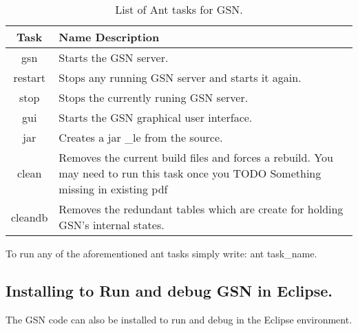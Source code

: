 \setlength{\tymin}{10pt}
\setlength{\tymax}{0.8\textwidth}
\begin{table*}[!htp] 
\centering
{\normalfont\footnotesize
\begin{tabulary}{\textwidth}{|C|J|}%
\hline

Task
 & 
Name Description
 \\
\hline

gsn
 & 
Starts the GSN server.
 \\
\hline

restart
 & 
Stops any running GSN server and starts it again.
 \\
\hline

stop
 & 
Stops the currently runing GSN server.
 \\
\hline

gui
 & 
Starts the GSN graphical user interface.
 \\
\hline

jar
 & 
Creates a jar \_le from the source.
 \\
\hline

clean
 & 
Removes the current build files and forces a rebuild. You may need to
run this task once you TODO Something missing in existing pdf
 \\
\hline

cleandb
 & 
Removes the redundant tables which are create for holding GSN's
internal states.
 \\
\hline
\end{tabulary}
}\caption{List of Ant tasks for GSN.}
\end{table*}

To run any of the aforementioned ant tasks simply write: ant task\_name.

\subsection{Installing to Run and debug GSN in Eclipse.}

The GSN code can also be installed to run and debug in the Eclipse
environment.

